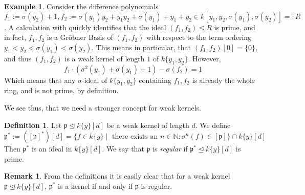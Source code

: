 \documentclass{article}
\def\N{\mathbb{N}}
\def\p{\mathfrak{p}}
\def\s{\sigma}
\theoremstyle{definition}
\newtheorem{ex}[Satz]{Example}
\newtheorem{rem}[Satz]{Remark}
\newtheorem{defn}[Satz]{Definition}
\begin{document}
\begin{ex}
Consider the difference polynomials $f_1 := \s(y_2) + 1, f_2:= \s(y_1)y_2 + y_1y_2 + \s(y_1) + y_1 + y_2 \in k[y_1,y_2,\s(y_1),\s(y_2)] =: R$.
A calculation with \cite{M2} quickly identifies that the ideal $(f_1,f_2) \unlhd R$ is prime, and in fact, $f_1,f_2$ is a Gr\"{o}bner Basis of $(f_1,f_2)$ with respect to the
term ordering $y_1 < y_2 < \s(y_1) < \s(y_2)$. This means in particular, that $(f_1,f_2)[0] = \{0\}$, and thus $(f_1,f_2)$ is a weak kernel of length $1$ of $k\{y_1,y_2\}$. However,
\[ f_1 \cdot (\s^2(y_1) + \s(y_1) + 1 ) - \s(f_2) = 1 \]
Which means that any $\s$-ideal of $k\{y_1,y_2\}$ containing $f_1, f_2$ is already the whole ring, and is not prime, by definition.
\end{ex}

We see thus, that we need a stronger concept for weak kernels. 

\begin{defn}
Let $\p \unlhd k\{y\}[d]$ be a weak kernel of length $d$. We define 
\[\p^* := ([\p]^*)[d] = \{ f \in k\{y\} \mid \text{ there exists an } n \in \N: \s^n(f) \in [\p] \} \cap k\{y\}[d] \]
Then $\p^*$ is an ideal in $k\{y\}[d]$. We say that $\p$ is \emph{regular} if $\p^* \unlhd k\{y\}[d]$ is prime. 
\end{defn}

\begin{rem}\label{regular->kernel}
From the definitions it is easily clear that for a weak kernel $\p \unlhd k\{y\}[d]$, $\p^*$ is a kernel if and only if $\p$ is regular. 
\end{rem}
\end{document}
